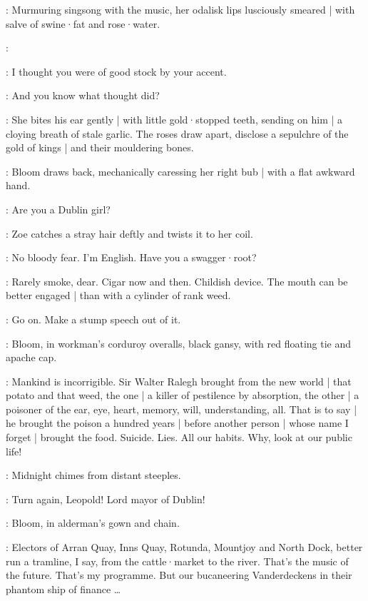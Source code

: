 :
Murmuring singsong with the music,
her odalisk lips lusciously smeared |
with salve of swine·fat and rose·water.

\Zoe:

\Bloom:
I thought you were of good stock by your accent.

\Zoe:
And you know what thought did?

:
She bites his ear gently |
with little gold·stopped teeth,
sending on him |
a cloying breath of stale garlic.
The roses draw apart,
disclose a sepulchre of the gold of kings |
and their mouldering bones.

:
Bloom draws back,
mechanically caressing her right bub |
with a flat awkward hand.

\Bloom:
Are you a Dublin girl?

:
Zoe catches a stray hair deftly and twists it to her coil.

\Zoe:
No bloody fear.
I'm English.
Have you a swagger·root?

\Bloom:
Rarely smoke,
dear.
Cigar now and then.
Childish device.
The mouth can be better engaged |
than with a cylinder of rank weed.

\Zoe:
Go on.
Make a stump speech out of it.


\par

:
Bloom,
in workman's corduroy overalls,
black gansy,
with red floating tie and apache cap.

\Bloom:
Mankind is incorrigible.
Sir Walter Ralegh brought from the new world |
that potato and that weed,
the one |
a killer of pestilence by absorption,
the other |
a poisoner of the ear,
eye,
heart,
memory,
will,
understanding,
all.
That is to say |
he brought the poison a hundred years |
before another person |
whose name I forget |
brought the food.
Suicide.
Lies.
All our habits.
Why,
look at our public life!

:
Midnight chimes from distant steeples.

\Chimes:
Turn again,
Leopold!
Lord mayor of Dublin!

:
Bloom,
in alderman's gown and chain.

\Bloom:
Electors of Arran Quay,
Inns Quay,
Rotunda,
Mountjoy and North Dock,
better run a tramline,
I say,
from the cattle·market to the river.
That's the music of the future.
That's my programme.
But our bucaneering Vanderdeckens in their phantom ship of finance \ldots%

